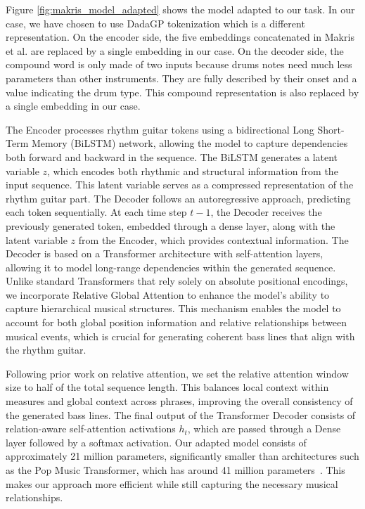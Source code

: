 Figure \ref{fig:makris_model_adapted} shows the model adapted to our task.
In our case, we have chosen to use DadaGP tokenization which is a different representation.
On the encoder side, the five embeddings concatenated in Makris et al. are replaced by a single embedding in our case.
On the decoder side, the compound word is only made of two inputs because drums notes need much less parameters than other instruments.
They are fully described by their onset and a value indicating the drum type.
This compound representation is also replaced by a single embedding in our case.

The Encoder processes rhythm guitar tokens using a bidirectional Long Short-Term Memory (BiLSTM) network, allowing the model to capture dependencies both forward and backward in the sequence.
The BiLSTM generates a latent variable \( z \), which encodes both rhythmic and structural information from the input sequence.
This latent variable serves as a compressed representation of the rhythm guitar part. 
The Decoder follows an autoregressive approach, predicting each token sequentially.
At each time step \( t-1 \), the Decoder receives the previously generated token, embedded through a dense layer, along with the latent variable \( z \) from the Encoder, which provides contextual information.
The Decoder is based on a Transformer architecture with self-attention layers, allowing it to model long-range dependencies within the generated sequence.
Unlike standard Transformers that rely solely on absolute positional encodings, we incorporate Relative Global Attention to enhance the model's ability to capture hierarchical musical structures.
This mechanism enables the model to account for both global position information and relative relationships between musical events, which is crucial for generating coherent bass lines that align with the rhythm guitar.  

Following prior work on relative attention, we set the relative attention window size to half of the total sequence length.
This balances local context within measures and global context across phrases, improving the overall consistency of the generated bass lines.
The final output of the Transformer Decoder consists of relation-aware self-attention activations \( h_t \), which are passed through a Dense layer followed by a softmax activation.
Our adapted model consists of approximately 21 million parameters, significantly smaller than architectures such as the Pop Music Transformer, which has around 41 million parameters~\cite{huang_pop_2020}.
This makes our approach more efficient while still capturing the necessary musical relationships.  

